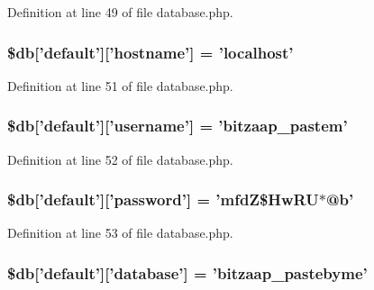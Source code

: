 Definition at line 49 of file database.\-php.

\hypertarget{production_2database_8php_a987b8cb0ae83b9519cb7c36fe25dbdd8}{
\subsubsection[{\$db}]{\setlength{\rightskip}{0pt plus 5cm}\$db\mbox{[}'default'\mbox{]}\mbox{[}'hostname'\mbox{]} = 'localhost'}}\label{production_2database_8php_a987b8cb0ae83b9519cb7c36fe25dbdd8}


Definition at line 51 of file database.\-php.

\hypertarget{production_2database_8php_a2f535f16fa00521992cfc791c8dcec37}{
\subsubsection[{\$db}]{\setlength{\rightskip}{0pt plus 5cm}\$db\mbox{[}'default'\mbox{]}\mbox{[}'username'\mbox{]} = 'bitzaap\-\_\-pastem'}}\label{production_2database_8php_a2f535f16fa00521992cfc791c8dcec37}


Definition at line 52 of file database.\-php.

\hypertarget{production_2database_8php_a1f6afce218438d9f7d13e28ee602e29b}{
\subsubsection[{\$db}]{\setlength{\rightskip}{0pt plus 5cm}\$db\mbox{[}'default'\mbox{]}\mbox{[}'password'\mbox{]} = 'mfd\-Z\$\-Hw\-R\-U$\ast$@{\bf b}'}}\label{production_2database_8php_a1f6afce218438d9f7d13e28ee602e29b}


Definition at line 53 of file database.\-php.

\hypertarget{production_2database_8php_a87e73e2a5365d1ee95a673b551238fef}{
\subsubsection[{\$db}]{\setlength{\rightskip}{0pt plus 5cm}\$db\mbox{[}'default'\mbox{]}\mbox{[}'database'\mbox{]} = 'bitzaap\-\_\-pastebyme'}}\label{production_2database_8php_a87e73e2a5365d1ee95a673b551238fef}


